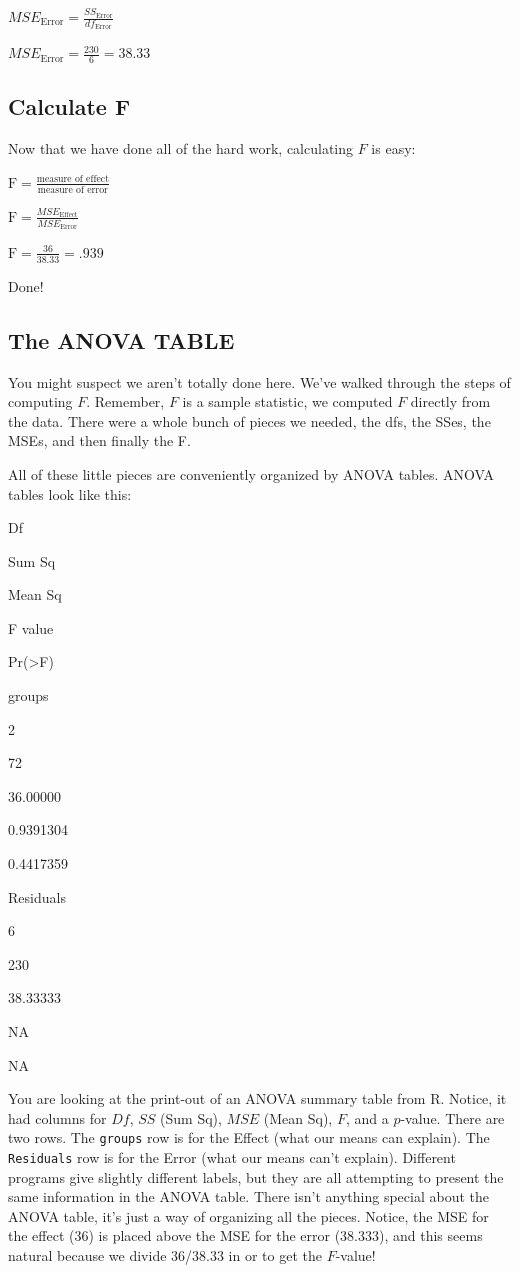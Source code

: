 \documentclass[
]{book}
\begin{document}
\(MSE_\text{Error} = \frac{SS_\text{Error}}{df_\text{Error}}\)

\(MSE_\text{Error} = \frac{230}{6} = 38.33\)

\hypertarget{calculate-f}{%
\subsection{Calculate F}\label{calculate-f}}

Now that we have done all of the hard work, calculating \(F\) is easy:

\(\text{F} = \frac{\text{measure of effect}}{\text{measure of error}}\)

\(\text{F} = \frac{MSE_\text{Effect}}{MSE_\text{Error}}\)

\(\text{F} = \frac{36}{38.33} = .939\)

Done!

\hypertarget{the-anova-table}{%
\subsection{The ANOVA TABLE}\label{the-anova-table}}

You might suspect we aren't totally done here. We've walked through the steps of computing \(F\). Remember, \(F\) is a sample statistic, we computed \(F\) directly from the data. There were a whole bunch of pieces we needed, the dfs, the SSes, the MSEs, and then finally the F.

All of these little pieces are conveniently organized by ANOVA tables. ANOVA tables look like this:

Df

Sum Sq

Mean Sq

F value

Pr(\textgreater F)

groups

2

72

36.00000

0.9391304

0.4417359

Residuals

6

230

38.33333

NA

NA

You are looking at the print-out of an ANOVA summary table from R. Notice, it had columns for \(Df\), \(SS\) (Sum Sq), \(MSE\) (Mean Sq), \(F\), and a \(p\)-value. There are two rows. The \texttt{groups} row is for the Effect (what our means can explain). The \texttt{Residuals} row is for the Error (what our means can't explain). Different programs give slightly different labels, but they are all attempting to present the same information in the ANOVA table. There isn't anything special about the ANOVA table, it's just a way of organizing all the pieces. Notice, the MSE for the effect (36) is placed above the MSE for the error (38.333), and this seems natural because we divide 36/38.33 in or to get the \(F\)-value!
\end{document}
